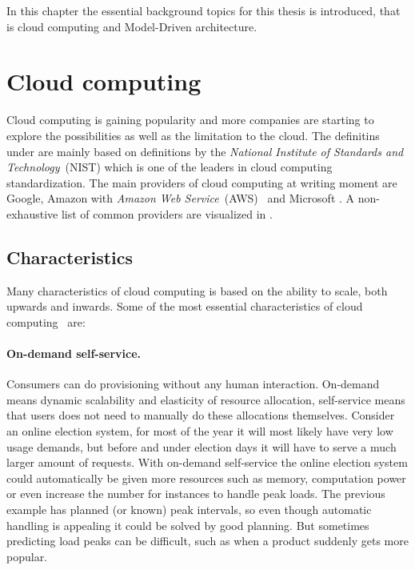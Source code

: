 


In this chapter the essential background topics for this thesis is introduced,
that is cloud computing and Model-Driven architecture.

\section{Cloud computing}

Cloud computing is gaining popularity and more companies are starting 
to explore the possibilities as well as the limitation to the cloud.
The definitins under are mainly based on definitions by 
the \emph{National Institute of Standards and Technology}~(NIST) which is one of 
the leaders in cloud computing standardization.
The main providers of cloud computing at writing moment 
are Google, Amazon with \emph{Amazon Web Service}~(AWS)~\cite{aws} and Microsoft .
A non-exhaustive list of common providers are visualized in .

\subsection{Characteristics}

Many characteristics of cloud computing is based on the ability to scale, both upwards and inwards.
Some of the most essential characteristics of cloud computing~\cite{nist:mell11} are:

\paragraph{On-demand self-service.} 

Consumers can do provisioning without any human interaction.
On-demand means dynamic scalability and elasticity of resource allocation,
self-service means that users does not need to manually do these allocations themselves.
Consider an online election system, for most of the year it will most likely have very
low usage demands, but before and under election days it will have to serve
a much larger amount of requests. With on-demand self-service the online election system
could automatically be given more resources such as memory, computation power or even
increase the number for instances to handle peak loads.
The previous example has planned (or known) peak intervals, so even though automatic handling
is appealing it could be solved by good planning. 
But sometimes predicting load peaks can be difficult, such as when a product suddenly
gets more popular.

